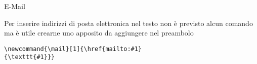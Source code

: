 \begin{frame}[fragile]{E-Mail}

Per inserire indirizzi di posta elettronica nel testo non è previsto alcun 
comando ma è utile crearne uno apposito da aggiungere nel preambolo

\vfill

\begin{lstlisting}
\newcommand{\mail}[1]{\href{mailto:#1}
{\texttt{#1}}}
\end{lstlisting}

\end{frame}